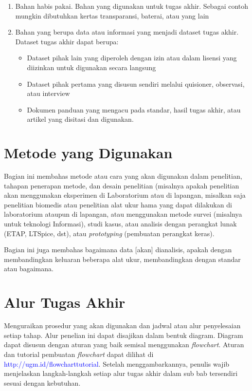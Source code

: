 \begin{enumerate}
	\item Bahan habis pakai. Bahan yang digunakan untuk tugas akhir. Sebagai contoh 
	mungkin dibutuhkan kertas transparansi, baterai, atau yang lain 
	\item Bahan yang berupa data atau informasi yang menjadi dataset tugas akhir. Dataset tugas akhir dapat berupa:
	\begin{itemize}
		\item Dataset pihak lain yang diperoleh dengan izin atau dalam lisensi yang diizinkan untuk digunakan secara langsung 
		\item Dataset pihak pertama yang disusun sendiri melalui quisioner, observasi, atau interview 
		\item Dokumen panduan yang mengacu pada standar, hasil tugas akhir, atau artikel yang disitasi dan digunakan.
	\end{itemize}
	
\end{enumerate}



\section{Metode yang Digunakan}

Bagian ini membahas metode atau cara yang akan digunakan dalam penelitian, tahapan 
penerapan metode, dan desain penelitian (misalnya apakah penelitian akan menggunakan 
eksperimen di Laboratorium atau di lapangan, misalkan saja penelitian biomedis atau 
penelitian alat ukur hama yang dapat dilakukan di laboratorium ataupun di lapangan, atau menggunakan metode survei (misalnya untuk teknologi Informasi), studi kasus, atau analisis dengan perangkat lunak (ETAP, LTSpice, dst), atau \textit{prototyping} (pembuatan perangkat keras).

Bagian ini juga membahas bagaimana data [akan] dianalisis, apakah dengan membandingkan keluaran beberapa alat ukur, membandingkan dengan standar atau bagaimana.

\section{Alur Tugas Akhir}

Menguraikan prosedur yang akan digunakan dan jadwal atau alur penyelesaian setiap 
tahap. Alur penelian ini dapat disajikan dalam bentuk diagram. Diagram dapat disusun dengan aturan yang baik semisal menggunakan \textit{flowchart}. Aturan dan tutorial pembuatan \textit{flowchart} dapat dilihat di \textcolor{blue}{http://ugm.id/flowcharttutorial}. Setelah menggambarkannya, penulis wajib menjelaskan langkah-langkah setiap alur tugas akhir dalam sub bab tersendiri sesuai dengan kebutuhan.

